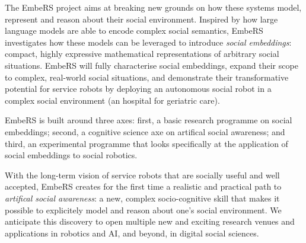 \documentclass[11pt,a4paper]{report}
\newcommand{\project}{EmbeRS\xspace}
\begin{document}


The \project project aims at breaking new grounds on how these systems
model, represent and reason about their social environment. Inspired by how
large language models are able to encode complex social semantics, \project
investigates how these models can be leveraged to introduce \emph{social
embeddings}: compact, highly expressive mathematical representations of
arbitrary social situations.  \project
will fully characterise social embeddings, expand their scope to complex,
real-world social situations, and demonstrate their transformative potential
for service robots by deploying an autonomous social robot in a complex social
environment (an hospital for geriatric care).

\project is built around three axes: first, a basic research programme on
social embeddings; second, a cognitive science axe on artifical social
awareness; and third, an experimental programme that looks specifically at the
application of social embeddings to social robotics.

%
%
%

With the long-term vision of service robots that are socially useful and well
accepted, \project creates for the first time a realistic and practical path to
\emph{artifical social awareness}: a new, complex
socio-cognitive skill that makes it possible to explicitely model and reason
about one's social environment. We anticipate this discovery to open multiple
new and exciting research venues and applications in robotics and AI, and
beyond, in digital social sciences.
\end{document}
